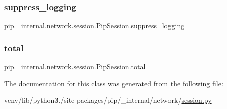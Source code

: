 \subsubsection{\texorpdfstring{suppress\+\_\+logging}{suppress\_logging}}
{\footnotesize\ttfamily pip.\+\_\+internal.\+network.\+session.\+Pip\+Session.\+suppress\+\_\+logging\hspace{0.3cm}{\ttfamily [static]}}

\mbox{\label{classpip_1_1__internal_1_1network_1_1session_1_1PipSession_a68ca6b648126f2ca6e30075b6dfdd5bb}} 
\subsubsection{\texorpdfstring{total}{total}}
{\footnotesize\ttfamily pip.\+\_\+internal.\+network.\+session.\+Pip\+Session.\+total\hspace{0.3cm}{\ttfamily [static]}}



The documentation for this class was generated from the following file\+:\begin{DoxyCompactItemize}
\item 
venv/lib/python3./site-\/packages/pip/\+\_\+internal/network/\hyperlink{session_8py}{session.\+py}\end{DoxyCompactItemize}
